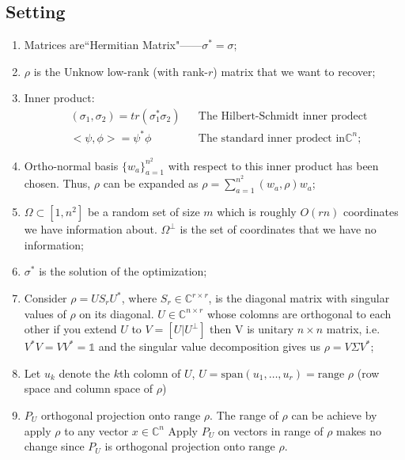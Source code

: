 \documentclass{article}
\begin{document}
\subsection{Setting}
\begin{enumerate}
\item Matrices are``Hermitian Matrix"------$\sigma^* = \sigma$;

\item $\rho$ is the Unknow low-rank (with rank-$r$) matrix that we want to recover;

\item Inner product:
\begin{align*}
& (\sigma_1, \sigma_2) = tr(\sigma_1^*\sigma_2) 
& &  \text {The Hilbert-Schmidt inner prodect}\\
& <\psi,\phi>  = \psi^*\phi 
& & \text {The standard inner prodect in} \mathbb{C}^n;
\end{align*}


\item {\color{blue}Ortho-normal basis} $\{w_a\}^{n^2}_{a=1}$ with respect to this inner product has been chosen. Thus, $\rho$ can be expanded as $\rho = \sum_{a=1}^{n^2}(w_a,\rho) w_a$;

\item $\Omega\subset[1,n^2]$  be a random set of size $m$ which is roughly $O(rn)$ coordinates we have information about.
$\Omega^{\perp}$ is the set of coordinates that we have no information;

\item $\sigma^*$ is the solution of the optimization;

\item Consider $\rho = U S_r U^*$, where $S_r \in \mathbb{C}^{r \times r}$, is the diagonal matrix with singular values of $\rho$ on its diagonal. $U \in \mathbb{C}^{n\times r}$ whose colomns are orthogonal to each other if you extend $U$ to $V=[U|U^\perp]$ then V is unitary $n\times n$ matrix, i.e. $V^*V = VV^* = \mathbb{1}$ and the singular value decomposition gives us $\rho = V\Sigma V^*$;

\item Let $u_k$ denote the $k$th colomn of $U$, $U=\text{span}(u_1,\dots,u_r)= \text{range }\rho$ (row space and column space of $\rho$)


\item $P_U$ orthogonal projection onto $\text{range } \rho$. The range of $\rho$ can be achieve by apply $\rho$ to any vector $x \in \mathbb{C}^n$  Apply $P_U$ on vectors in range of $\rho$ makes no change since $P_U$ is orthogonal projection onto $\text{range } \rho$.


\end{enumerate}
\end{document}
